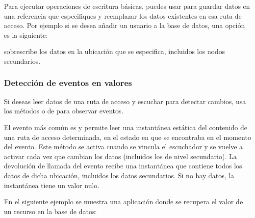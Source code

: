 Para ejecutar operaciones de escritura básicas, puedes usar  para guardar
datos en una referencia que especifiques y reemplazar los datos existentes en
esa ruta de acceso. Por ejemplo si se desea añadir un usuario a la base de datos,
una opción es la siguiente:

%
\begin{sphinxVerbatim}[commandchars=\\\{\}]
     
  
     
     
      
\end{sphinxVerbatim}

 sobrescribe los datos en la ubicación que se especifica, incluidos
los nodos secundarios.


\subsubsection*{Detección de eventos en valores}
\label{\detokenize{firebase_web:detecta-eventos-en-valores}}
Si deseas leer datos de una ruta de acceso y escuchar para detectar cambios,
usa los métodos  o  de 
para observar eventos.

El evento más común es  y permite leer una instantánea estática del
contenido de una ruta de acceso determinada, en el estado en que se encontraba
en el momento del evento. Este método se activa cuando se vincula el escuchador
y se vuelve a activar cada vez que cambian los datos (incluidos los de
nivel secundario). La devolución de llamada del evento recibe una instantánea
que contiene todos los datos de dicha ubicación, incluidos los datos
secundarios. Si no hay datos, la instantánea tiene un valor nulo.

En el siguiente ejemplo se muestra una aplicación donde se recupera el valor
de un recurso en la base de datos:

